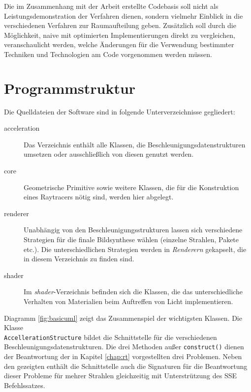 Die im Zusammenhang mit der Arbeit erstellte Codebasis soll nicht als Leistungsdemonstration der Verfahren dienen, sondern vielmehr Einblick in die verschiedenen Verfahren zur Raumaufteilung geben. Zusätzlich soll durch die Möglichkeit, naive mit optimierten Implementierungen direkt zu vergleichen, veranschaulicht werden, welche Änderungen für die Verwendung bestimmter Techniken und Technologien am Code vorgenommen werden müssen.

\section{Programmstruktur}

Die Quelldateien der Software sind in folgende Unterverzeichnisse gegliedert:
\begin{description}
 \item[acceleration]Das Verzeichnis enthält alle Klassen, die Beschleunigungsdatenstrukturen umsetzen oder ausschließlich von diesen genutzt werden.
 \item[core]Geometrische Primitive sowie weitere Klassen, die für die Konstruktion eines Raytracers nötig sind, werden hier abgelegt.
 \item[renderer]Unabhängig von den Beschleunigungsstrukturen lassen sich verschiedene Strategien für die finale
 Bildsynthese wählen (einzelne Strahlen, Pakete etc.). Die unterschiedlichen Strategien werden in \textit{Renderern} gekapselt, die in diesem Verzeichnis zu finden sind.
 \item[shader]Im \textit{shader}-Verzeichnis befinden sich die Klassen, die das unterschiedliche Verhalten von Materialien beim Auftreffen von Licht implementieren.
 \end{description}

Diagramm \ref{fig:basicuml} zeigt das Zusammenspiel der wichtigsten Klassen. Die Klasse \\ \verb|AccellerationStructure| bildet die Schnittstelle für die verschiedenen Beschleunigungsdatenstrukturen. Die drei Methoden außer \verb|construct()| dienen der Beantwortung der in Kapitel \ref{chap:rt} vorgestellten drei Problemen. Neben den gezeigten enthält die Schnittstelle auch die Signaturen für die Beantwortung dieser Probleme für mehrer Strahlen gleichzeitig mit Unterstrützung des SSE Befehlssatzes.

